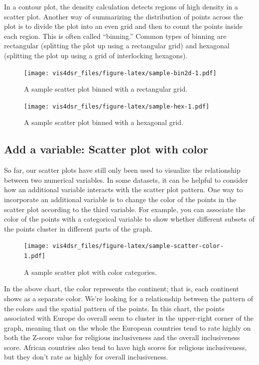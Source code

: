 \documentclass[
]{krantz}
\begin{document}
In a contour plot, the density calculation detects regions of high density in a
scatter plot. Another way of summarizing the distribution of points across the plot
is to divide the plot into an even grid and then to count the points inside each
region. This is often called ``binning.'' Common types of binning are rectangular
(splitting the plot up using a rectangular grid) and hexagonal (splitting the
plot up using a grid of interlocking hexagons).

\begin{figure}
\centering
\texttt{[image: vis4dsr\_files/figure-latex/sample-bin2d-1.pdf]}
\caption{\label{fig:sample-bin2d}A sample scatter plot binned with a rectangular grid.}
\end{figure}

\begin{figure}
\centering
\texttt{[image: vis4dsr\_files/figure-latex/sample-hex-1.pdf]}
\caption{\label{fig:sample-hex}A sample scatter plot binned with a hexagonal grid.}
\end{figure}

\hypertarget{add-a-variable-scatter-plot-with-color}{%
\subsection{Add a variable: Scatter plot with color}\label{add-a-variable-scatter-plot-with-color}}

So far, our scatter plots have still only been used to visualize the relationship
between two numerical variables. In some datasets, it can be helpful to consider
how an additional variable interacts with the scatter plot pattern. One way to
incorporate an additional variable is to change the color of the points in the
scatter plot according to the third variable. For example, you can associate the
color of the points with a categorical variable to show whether different subsets
of the points cluster in different parts of the graph.

\begin{figure}
\centering
\texttt{[image: vis4dsr\_files/figure-latex/sample-scatter-color-1.pdf]}
\caption{\label{fig:sample-scatter-color}A sample scatter plot with color categories.}
\end{figure}

In the above chart, the color represents the continent; that is, each continent shows
as a separate color. We're looking for a relationship between the pattern of the colors
and the spatial pattern of the points. In this chart, the points associated with
Europe do overall seem to cluster in the upper-right corner of the graph, meaning that
on the whole the European countries tend to rate highly on both the Z-score value
for religious inclusiveness and the overall inclusiveness score. African countries
also tend to have high scores for religious inclusiveness, but they don't rate as
highly for overall inclusiveness.
\end{document}
